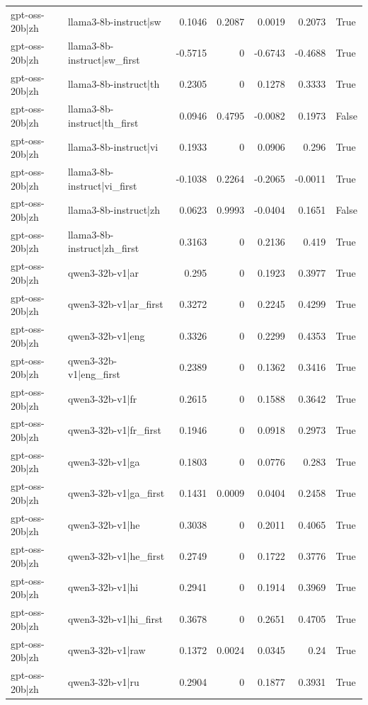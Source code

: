 \begin{table}
\begin{tabular}{l l r r r r l}
gpt-oss-20b|zh & llama3-8b-instruct|sw & 0.1046 & 0.2087 & 0.0019 & 0.2073 & True \\
gpt-oss-20b|zh & llama3-8b-instruct|sw_first & -0.5715 & 0 & -0.6743 & -0.4688 & True \\
gpt-oss-20b|zh & llama3-8b-instruct|th & 0.2305 & 0 & 0.1278 & 0.3333 & True \\
gpt-oss-20b|zh & llama3-8b-instruct|th_first & 0.0946 & 0.4795 & -0.0082 & 0.1973 & False \\
gpt-oss-20b|zh & llama3-8b-instruct|vi & 0.1933 & 0 & 0.0906 & 0.296 & True \\
gpt-oss-20b|zh & llama3-8b-instruct|vi_first & -0.1038 & 0.2264 & -0.2065 & -0.0011 & True \\
gpt-oss-20b|zh & llama3-8b-instruct|zh & 0.0623 & 0.9993 & -0.0404 & 0.1651 & False \\
gpt-oss-20b|zh & llama3-8b-instruct|zh_first & 0.3163 & 0 & 0.2136 & 0.419 & True \\
gpt-oss-20b|zh & qwen3-32b-v1|ar & 0.295 & 0 & 0.1923 & 0.3977 & True \\
gpt-oss-20b|zh & qwen3-32b-v1|ar_first & 0.3272 & 0 & 0.2245 & 0.4299 & True \\
gpt-oss-20b|zh & qwen3-32b-v1|eng & 0.3326 & 0 & 0.2299 & 0.4353 & True \\
gpt-oss-20b|zh & qwen3-32b-v1|eng_first & 0.2389 & 0 & 0.1362 & 0.3416 & True \\
gpt-oss-20b|zh & qwen3-32b-v1|fr & 0.2615 & 0 & 0.1588 & 0.3642 & True \\
gpt-oss-20b|zh & qwen3-32b-v1|fr_first & 0.1946 & 0 & 0.0918 & 0.2973 & True \\
gpt-oss-20b|zh & qwen3-32b-v1|ga & 0.1803 & 0 & 0.0776 & 0.283 & True \\
gpt-oss-20b|zh & qwen3-32b-v1|ga_first & 0.1431 & 0.0009 & 0.0404 & 0.2458 & True \\
gpt-oss-20b|zh & qwen3-32b-v1|he & 0.3038 & 0 & 0.2011 & 0.4065 & True \\
gpt-oss-20b|zh & qwen3-32b-v1|he_first & 0.2749 & 0 & 0.1722 & 0.3776 & True \\
gpt-oss-20b|zh & qwen3-32b-v1|hi & 0.2941 & 0 & 0.1914 & 0.3969 & True \\
gpt-oss-20b|zh & qwen3-32b-v1|hi_first & 0.3678 & 0 & 0.2651 & 0.4705 & True \\
gpt-oss-20b|zh & qwen3-32b-v1|raw & 0.1372 & 0.0024 & 0.0345 & 0.24 & True \\
gpt-oss-20b|zh & qwen3-32b-v1|ru & 0.2904 & 0 & 0.1877 & 0.3931 & True \\

\end{tabular}
\end{table}
